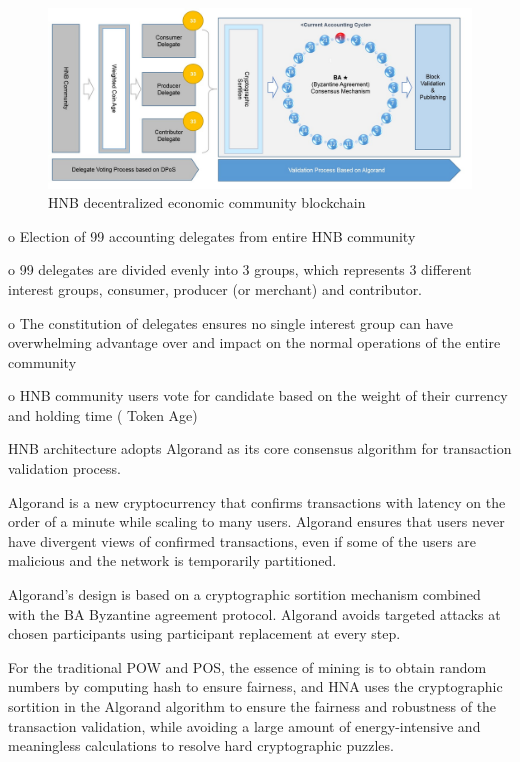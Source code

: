 \documentclass[fleqn,10pt]{SelfArx} %
\begin{document}
\begin{figure}[ht]\centering %
\includegraphics[width=\linewidth]{26}
\caption{HNB decentralized economic community blockchain}
\label{fig:26}
\end{figure}


o	Election of 99 accounting delegates from entire HNB community

o	99 delegates are divided evenly into 3 groups, which represents 3 different interest groups, consumer, producer (or merchant) and contributor. 

o	The constitution of delegates ensures no single interest group can have overwhelming advantage over and impact on the normal operations of the entire community

o	HNB community users vote for candidate based on the weight of their currency and holding time ( Token Age)\\



HNB architecture adopts Algorand as its core consensus algorithm for transaction validation process.

Algorand is a new cryptocurrency that confirms transactions with latency on the order of a minute while scaling to many users. Algorand ensures that users never have divergent views of confirmed transactions, even if some of the users are malicious and the network is temporarily partitioned.

Algorand's design is based on a cryptographic sortition mechanism combined with the BA Byzantine agreement protocol. Algorand avoids targeted attacks at chosen participants using participant replacement at every step. 

For the traditional POW and POS, the essence of mining is to obtain random numbers by computing hash to ensure fairness, and HNA uses the cryptographic sortition in the Algorand algorithm to ensure the fairness and robustness of the transaction validation, while avoiding a large amount of energy-intensive and meaningless calculations to resolve hard cryptographic puzzles.
\end{document}
